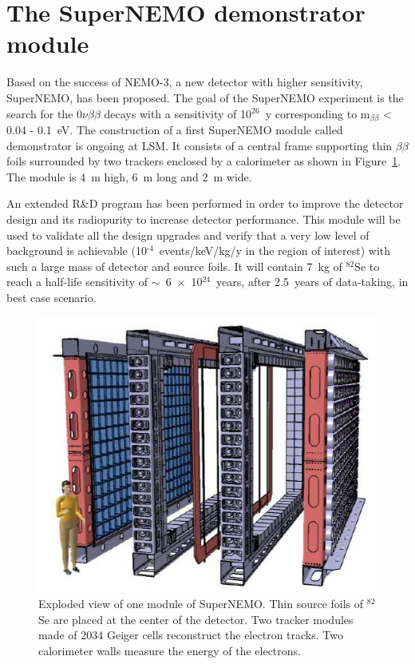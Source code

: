 \documentclass[main.tex]{subfiles}
\begin{document}
\FloatBarrier


\section{The SuperNEMO demonstrator module}\label{sec:SuperNEMO}


\NI Based on the success of NEMO-3, a new detector with higher sensitivity, SuperNEMO, has been proposed. The goal of the SuperNEMO experiment is the search for the 0$\nu\beta\beta$ decays with a sensitivity of 10$^{\text{26}}$~y corresponding to m$_{\beta\beta}$ < 0.04 - 0.1~eV. The construction of a first SuperNEMO module called demonstrator is ongoing at LSM. It consists of a central frame supporting thin $\beta\beta$ foils surrounded by two trackers enclosed by a calorimeter as shown in Figure~\ref{SuperNEMOexplodedView}. The module is 4~m high, 6~m long and 2~m wide.


\bigskip


\NI An extended R\&D program has been performed in order to improve the detector design and its radiopurity to increase detector performance. This module will be used to validate all the design upgrades and verify that a very low level of background is achievable (10$^{\text{-4}}$~events/keV/kg/y in the region of interest) with such a large mass of detector and source foils. It will contain 7~kg of $^{\text{82}}$Se to reach a half-life sensitivity of $\sim$~6~$\times$~10$^{\text{24}}$~years, after 2.5~years of data-taking, in best case scenario.



\begin{figure}[h!]
\begin{center}
\includegraphics[scale=0.65]{pictures/Chap3/snemomodule.png}
\caption{Exploded view of one module of SuperNEMO. Thin source foils of $^{\text{82}}$Se are placed at the center of the detector. Two tracker modules made of 2034 Geiger cells reconstruct the electron tracks. Two calorimeter walls measure the energy of the electrons.}
\label{SuperNEMOexplodedView}
\end{center}
\end{figure}
\end{document}
